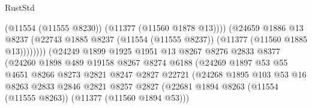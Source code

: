 \begin{lexlean}{RustStd}
\begin{coremodule}
                                              (@11554 (@11555 @8230))
                                              (@11377 (@11560 @1878 @13))))
                                          (@24659
                                            @1886
                                            @13
                                            @8237
                                            (@22743
                                              @1885
                                              @8237
                                              (@11554 (@11555 @8237))
                                              (@11377 (@11560 @1885 @13))))))))
                                  (@24249
                                    @1899
                                    @1925
                                    @1951
                                    @13
                                    @8267
                                    @8276
                                    @2833
                                    @8377
                                    (@24260
                                      @1898
                                      @489
                                      @19158
                                      @8267
                                      @8274
                                      @6188
                                      (@24269
                                        @1897
                                        @53
                                        @55
                                        @4651
                                        @8266
                                        @8273
                                        @2821
                                        @8247
                                        @2827
                                        @22721
                                        (@24268
                                          @1895
                                          @103
                                          @53
                                          @16
                                          @8263
                                          @2833
                                          @2846
                                          @2821
                                          @8257
                                          @2827
                                          (@22681
                                            @1894
                                            @8263
                                            (@11554 (@11555 @8263))
                                            (@11377 (@11560 @1894 @53)))

\end{coremodule}
\end{lexlean}
